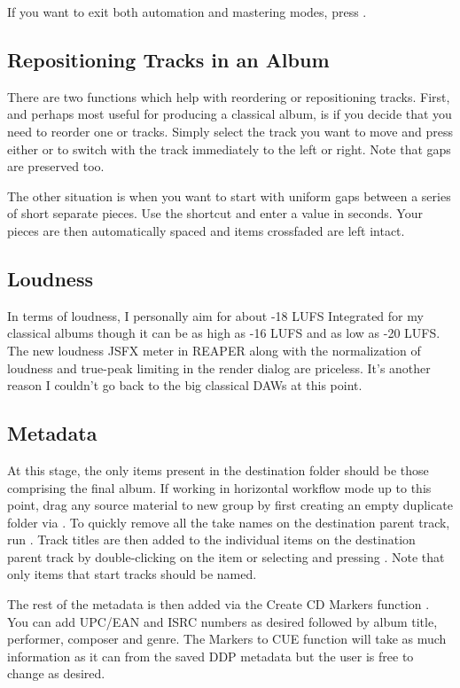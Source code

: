 \documentclass[10pt,american]{article}
\begin{document}
If you want to exit both automation and mastering modes, press .

\subsection{Repositioning Tracks in an Album}

There are two functions which help with reordering or repositioning tracks.
First, and perhaps most useful for producing a classical album, is if you decide
that you need to reorder one or tracks. Simply select the track you want to move
and press either \keys{\ctrl+\arrowkeyleft}or \keys{\ctrl+\arrowkeyright} to
switch with the track immediately to the left or right. Note that gaps are
preserved too. 

The other situation is when you want to start with uniform gaps between a series
of short separate pieces. Use the  shortcut and enter a value in
seconds. Your pieces are then automatically spaced and items crossfaded are left
intact.

\subsection{Loudness}

In terms of loudness, I personally aim for about -18 LUFS Integrated for my
classical albums though it can be as high as -16 LUFS and as low as -20 LUFS.
The new loudness JSFX meter in REAPER along with the normalization of loudness
and true-peak limiting in the render dialog are priceless. It's another reason I
couldn't go back to the big classical DAWs at this point.

\subsection{Metadata}

At this stage, the only items present in the destination folder should be those
comprising the final album. If working in horizontal workflow mode up to this
point, drag any source material to new group by first creating an empty
duplicate folder via \keys{\textbackslash}. To quickly remove all the take names
on the destination parent track, run . Track titles are then added
to the individual items on the destination parent track by double-clicking on
the item or selecting and pressing . Note that only items that start
tracks should be named. 

The rest of the metadata is then added via the Create CD Markers function
. You can add UPC/EAN and ISRC numbers as desired followed by album
title, performer, composer and genre. The Markers to CUE function  will
take as much information as it can from the saved DDP metadata but the user is
free to change as desired.
\end{document}
